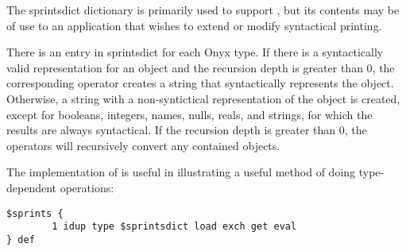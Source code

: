 The sprintsdict dictionary is primarily used to support
, but its contents may be of
use to an application that wishes to extend or modify syntactical printing.

There is an entry in sprintsdict for each Onyx type.  If there is a
syntactically valid representation for an object and the recursion depth is
greater than 0, the corresponding operator creates a string that syntactically
represents the object.  Otherwise, a string with a non-syntictical
representation of the object is created, except for booleans, integers, names,
nulls, reals, and strings, for which the results are always syntactical.  If the
recursion depth is greater than 0, the operators will recursively convert any
contained objects.

The implementation of  is
useful in illustrating a useful method of doing type-dependent operations:

\begin{verbatim}
$sprints {
        1 idup type $sprintsdict load exch get eval
} def
\end{verbatim}

